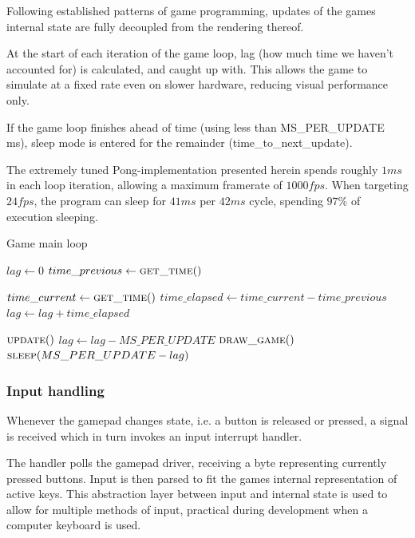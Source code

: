 Following established patterns of game programming, updates of the games
internal state are fully decoupled from the rendering thereof.

At the start of each iteration of the game loop, lag (how much time we haven't
accounted for) is calculated, and caught up with.
This allows the game to simulate at a fixed rate even on slower hardware,
reducing visual performance only.

If the game loop finishes ahead of time (using less than MS\_PER\_UPDATE ms),
sleep mode is entered for the remainder (time\_to\_next\_update).

The extremely tuned Pong-implementation presented herein spends roughly $ 1 ms
$ in each loop iteration, allowing a maximum framerate of $ 1000 fps $.  When
targeting $ 24 fps $, the program can sleep for $ 41 ms $ per $ 42 ms $ cycle,
spending $ 97 \% $ of execution sleeping.

\begin{algorithm}
  \caption{Game main loop}
  \begin{algorithmic}
    \State $lag \gets 0$
    \State $time\_previous \gets \Call{get\_time}{\null}$

    \Loop
      \State $time\_current \gets \Call{get\_time}{\null}$
      \State $time\_elapsed \gets time\_current - time\_previous$
      \State $lag \gets lag + time\_elapsed$

        \State $\Call{update}{\null}$
        \State $lag \gets lag - MS\_PER\_UPDATE$
      \EndWhile
      \State $\Call{draw\_game}{\null}$
      \State $\Call{sleep}{MS\_PER\_UPDATE - lag}$
    \EndLoop
  \end{algorithmic}
\end{algorithm}

\subsubsection{Input handling}
Whenever the gamepad changes state, i.e. a button is released or pressed,
a signal is received which in turn invokes an input interrupt handler.

The handler polls the gamepad driver, receiving a byte representing currently
pressed buttons. Input is then parsed to fit the games internal representation
of active keys. This abstraction layer between input and internal state is used
to allow for multiple methods of input, practical during development when a
computer keyboard is used.

